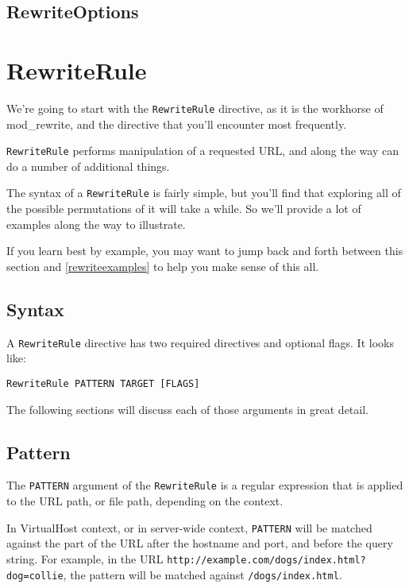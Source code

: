 \section{RewriteOptions}

\chapter{RewriteRule}
\label{chapter_rewriterule}

We're going to start with the \verb~RewriteRule~ directive, as it is the workhorse of mod\_rewrite, and the directive that you'll encounter most frequently.

\verb~RewriteRule~ performs manipulation of a requested URL, and along the way can do a number of additional things.

The syntax of a \verb~RewriteRule~ is fairly simple, but you'll find that exploring all of the possible permutations of it will take a while. So we'll provide a lot of examples along the way to illustrate.

If you learn best by example, you may want to jump back and forth between this section and \ref{rewriteexamples} to help you make sense of this all.

\section{Syntax}

A \verb~RewriteRule~ directive has two required directives and optional flags. It looks like:

\begin{verbatim}
RewriteRule PATTERN TARGET [FLAGS]
\end{verbatim}

The following sections will discuss each of those arguments in great detail.

\section{Pattern}

The \verb~PATTERN~ argument of the \verb~RewriteRule~ is a regular expression that is applied to the URL path, or file path, depending on the context.

In VirtualHost context, or in server-wide context, \verb~PATTERN~ will be matched against the part of the URL after the hostname and port, and before the query string. For example, in the URL \verb~http://example.com/dogs/index.html?dog=collie~, the pattern will be matched against \verb~/dogs/index.html~.

